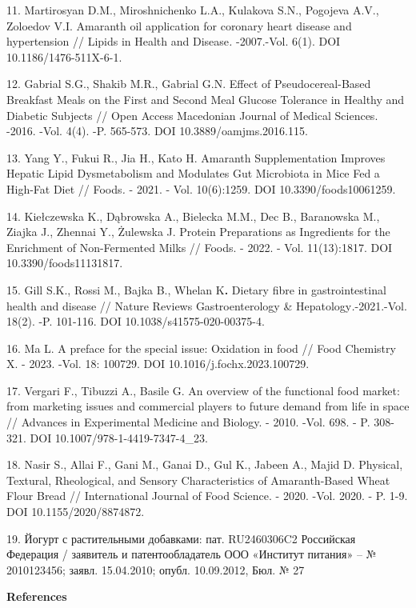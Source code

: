 \begin{references}
11. Martirosyan D.M., Miroshnichenko L.A., Kulakova S.N., Pogojeva A.V.,
Zoloedov V.I. Amaranth oil application for coronary heart disease and
hypertension // Lipids in Health and Disease\emph{.} -2007.-Vol. 6(1).
DOI 10.1186/1476-511X-6-1.

12. Gabrial S.G., Shakib M.R., Gabrial G.N. Effect of Pseudocereal-Based
Breakfast Meals on the First and Second Meal Glucose Tolerance in
Healthy and Diabetic Subjects // Open Access Macedonian Journal of
Medical Sciences. -2016. -Vol. 4(4). -P. 565-573.
DOI 10.3889/oamjms.2016.115.

13. Yang Y., Fukui R., Jia H., Kato H. Amaranth Supplementation Improves
Hepatic Lipid Dysmetabolism and Modulates Gut Microbiota in Mice Fed a
High-Fat Diet // Foods\emph{.} - 2021. - Vol. 10(6):1259. DOI
10.3390/foods10061259.

14. Kiełczewska K., Dąbrowska A., Bielecka M.M., Dec B., Baranowska M.,
Ziajka J., Zhennai Y., Żulewska J. Protein Preparations as Ingredients
for the Enrichment of Non-Fermented Milks // Foods. - 2022. - Vol.
11(13):1817. DOI 10.3390/foods11131817.

15. Gill S.K., Rossi M., Bajka B., Whelan K{\bfseries .} Dietary fibre in
gastrointestinal health and disease // Nature Reviews Gastroenterology
\& Hepatology\emph{.}-2021.-Vol. 18(2). -P. 101-116.
DOI 10.1038/s41575-020-00375-4.

16. Ma L. A preface for the special issue: Oxidation in food // Food
Chemistry X. - 2023. -Vol. 18: 100729. DOI 10.1016/j.fochx.2023.100729.

17. Vergari F., Tibuzzi A., Basile G. An overview of the functional food
market: from marketing issues and commercial players to future demand
from life in space // Advances in Experimental Medicine and Biology. -
2010. -Vol. 698. - P. 308-321. DOI 10.1007/978-1-4419-7347-4\_23.

18. Nasir S., Allai F., Gani M., Ganai D., Gul K., Jabeen A., Majid D.
Physical, Textural, Rheological, and Sensory Characteristics of
Amaranth-Based Wheat Flour Bread // International Journal of Food
Science. - 2020. -Vol. 2020. - P. 1-9. DOI 10.1155/2020/8874872.

19. Йогурт с растительными добавками: пат. RU2460306C2 Российская
Федерация / заявитель и патентообладатель ООО «Институт питания» -- №
2010123456; заявл. 15.04.2010; опубл. 10.09.2012, Бюл. № 27
\end{references}

\begin{center}
{\bfseries References}
\end{center}


